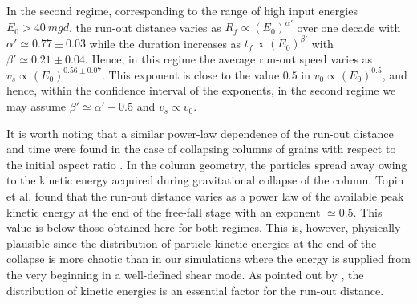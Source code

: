 In the second regime, corresponding to the range of high input energies  $E_0 > 
40 \ mgd$, the run-out distance varies as $R_f \propto (E_0)^{\alpha'}$ over one 
decade with $\alpha' \simeq 0.77\pm 0.03$ while the duration increases as $t_f 
\propto (E_0)^{\beta'}$ with $\beta' \simeq 0.21 \pm 0.04$. Hence, in this 
regime the average run-out speed varies as $v_s \propto (E_0)^{0.56 \pm 0.07}$. 
This exponent is close to the value $0.5$ in $v_0 \propto (E_0)^{0.5}$, and 
hence, within the confidence interval of the exponents, in the second regime we 
may assume $\beta' \simeq \alpha' - 0.5$ and $v_s \propto v_0$. 

It is worth noting that a similar power-law dependence of the 
run-out distance and time were found in the case of 
collapsing columns of grains with respect to the initial aspect ratio 
\cite{Topin2012}.  
In the column geometry, the particles spread away owing to the 
kinetic energy acquired during gravitational collapse of the column. 
Topin et al. found that the run-out distance varies as a power law 
of the available peak kinetic energy at the end of the free-fall stage with an 
exponent $\simeq 0.5$. This value is below those obtained here 
for both regimes. This is, however, physically plausible since the   
distribution of particle kinetic energies at the end of the collapse 
is more chaotic than in our simulations where the energy is supplied 
from the very beginning in a well-defined shear mode. As pointed out 
by \cite{Staron2005}, the distribution of kinetic energies is an essential 
factor for the run-out distance.

\label{fig:quake_mod}


